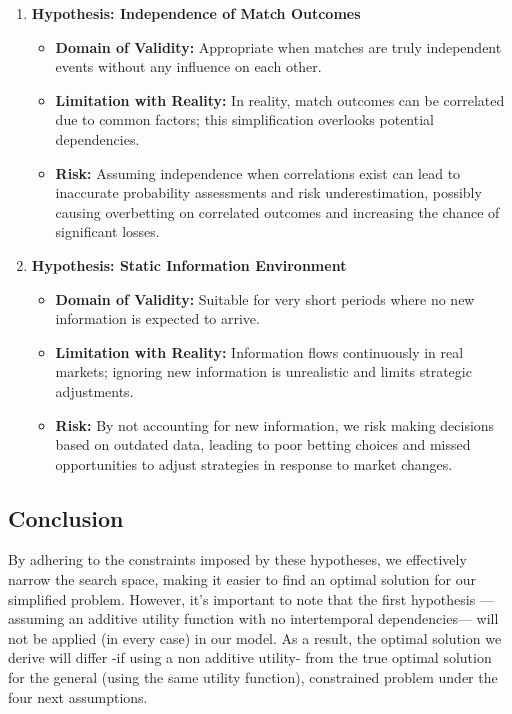 \begin{enumerate}
    \item \textbf{Hypothesis: Independence of Match Outcomes}
        \begin{itemize}
            \item \textbf{Domain of Validity:} Appropriate when matches are truly independent events without any influence on each other.
            \item \textbf{Limitation with Reality:} In reality, match outcomes can be correlated due to common factors; this simplification overlooks potential dependencies.
            \item \textbf{Risk:} Assuming independence when correlations exist can lead to inaccurate probability assessments and risk underestimation, possibly causing overbetting on correlated outcomes and increasing the chance of significant losses.
        \end{itemize}

    \item \textbf{Hypothesis: Static Information Environment}
        \begin{itemize}
            \item \textbf{Domain of Validity:} Suitable for very short periods where no new information is expected to arrive.
            \item \textbf{Limitation with Reality:} Information flows continuously in real markets; ignoring new information is unrealistic and limits strategic adjustments.
            \item \textbf{Risk:} By not accounting for new information, we risk making decisions based on outdated data, leading to poor betting choices and missed opportunities to adjust strategies in response to market changes.
        \end{itemize}

\end{enumerate}

\subsection{Conclusion}

By adhering to the constraints imposed by these hypotheses, we effectively narrow the search space, making it easier to find an optimal solution for our simplified problem. However, it's important to note that the first hypothesis —assuming an additive utility function with no intertemporal dependencies— will not be applied (in every case) in our model. As a result, the optimal solution we derive will differ -if using a non additive utility- from the true optimal solution for the general (using the same utility function), constrained problem under the four next assumptions.
